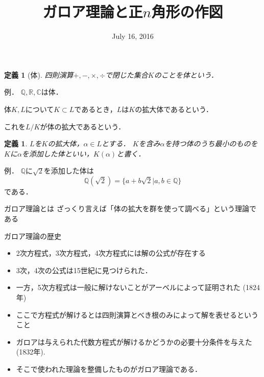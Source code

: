 \documentclass[dvipdfmx,17pt]{beamer}
\title{ガロア理論と正$n$角形の作図}
\date{July 16, 2016}
\theoremstyle{plain}
\newtheorem{defi}[thm]{定義}
\newcommand{\Q}{\mathbb{Q}}
\newcommand{\R}{\mathbb{R}}
\newcommand{\C}{\mathbb{C}}
\begin{document}
\begin{frame}\frametitle{}
\titlepage
\end{frame}

\begin{frame}
\begin{defi}[体]
四則演算$+, -, \times, \div$で閉じた集合$K$のことを体という．
\end{defi}
\end{frame}

\begin{frame}
例． $\Q, \R, \C$は体．
\end{frame}

\begin{frame}
体$K, L$について$K \subset L$であるとき，$L$は$K$の拡大体であるという．

これを$L/K$が体の拡大であるという．
\end{frame}

\begin{frame}
\begin{defi}
$L$を$K$の拡大体，$\alpha \in L$とする．
$K$を含み$\alpha$を持つ体のうち最小のものを$K$に$\alpha$を添加した体といい，$K(\alpha)$と書く．
\end{defi}
\end{frame}

\begin{frame}
例． $\Q$に$\sqrt{2}$を添加した体は
\[\Q(\sqrt{2}) = \{a+b\sqrt{2} | a, b \in \Q \} \]
である．
\end{frame}

\begin{frame}{ガロア理論とは}
ざっくり言えば「体の拡大を群を使って調べる」という理論である
\end{frame}

\begin{frame}{ガロア理論の歴史}
\begin{itemize}
\item 2次方程式，3次方程式，4次方程式には解の公式が存在する
\item 3次，4次の公式は15世紀に見つけられた．
\item 一方，5次方程式は一般に解けないことがアーベルによって証明された (1824年)
\item ここで方程式が解けるとは四則演算とべき根のみによって解を表せるということ
\end{itemize}
\end{frame}

\begin{frame}
\begin{itemize}
\item ガロアは与えられた代数方程式が解けるかどうかの必要十分条件を与えた (1832年).
\item そこで使われた理論を整備したものがガロア理論である．
\end{itemize}
\end{frame}
\end{document}
